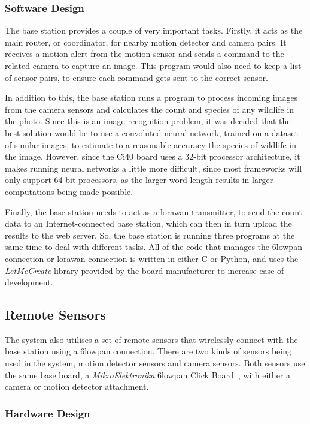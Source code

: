\subsubsection{Software Design}
The base station provides a couple of very important tasks. Firstly, it acts
as the main router, or coordinator, for nearby motion detector and camera
pairs. It receives a motion alert from the motion sensor and sends a command
to the related camera to capture an image. This program would also need to
keep a list of sensor pairs, to ensure each command gets sent to the correct
sensor.

In addition to this, the base station runs a program to process incoming
images from the camera sensors and calculates the count and species of any
wildlife in the photo. Since this is an image recognition problem, it was
decided that the best solution would be to use a convoluted neural network,
trained on a dataset of similar images, to estimate to a reasonable accuracy
the species of wildlife in the image. However, since the Ci40 board uses a
32-bit processor architecture, it makes running neural networks a little more
difficult, since most frameworks will only support 64-bit processors, as the
larger word length results in larger computations being made possible.

Finally, the base station needs to act as a \gls{lorawan} transmitter, to
send the count data to an Internet-connected base station, which can then in
turn upload the results to the web server. So, the base station is running
three programs at the same time to deal with different tasks. All of the code
that manages the \gls{6lowpan} connection or \gls{lorawan} connection is
written in either C or Python, and uses the \textit{LetMeCreate} library
provided by the board manufacturer to increase ease of development.

\subsection{Remote Sensors}

The system also utilises a set of remote sensors that wirelessly connect with
the base station using a \gls{6lowpan} connection. There are two kinds of
sensors being used in the system, motion detector sensors and camera sensors.
Both sensors use the same base board, a \textit{MikroElektronika}
\gls{6lowpan} Click Board~\cite{mikroeclick}, with either a camera or motion
detector attachment.

\subsubsection{Hardware Design}

